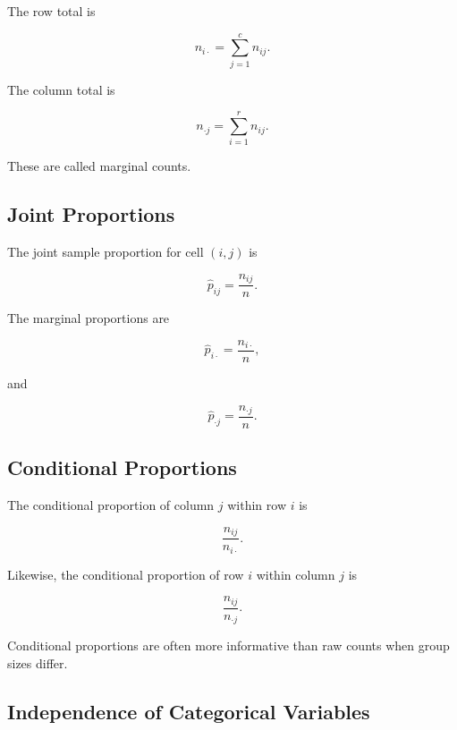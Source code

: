 The row total is

\[
\boxed{
n_{i\cdot}
=
\sum_{j=1}^{c}n_{ij}.
}
\]

The column total is

\[
\boxed{
n_{\cdot j}
=
\sum_{i=1}^{r}n_{ij}.
}
\]

These are called marginal counts.

\subsection{Joint Proportions}
\label{subsec:joint-proportions-categorical}

The joint sample proportion for cell \((i,j)\) is

\[
\boxed{
\widehat{p}_{ij}
=
\frac{n_{ij}}{n}.
}
\]

The marginal proportions are

\[
\boxed{
\widehat{p}_{i\cdot}
=
\frac{n_{i\cdot}}{n},
}
\]

and

\[
\boxed{
\widehat{p}_{\cdot j}
=
\frac{n_{\cdot j}}{n}.
}
\]

\subsection{Conditional Proportions}
\label{subsec:conditional-proportions-categorical}

The conditional proportion of column \(j\) within row \(i\) is

\[
\boxed{
\frac{n_{ij}}{n_{i\cdot}}.
}
\]

Likewise, the conditional proportion of row \(i\) within column \(j\) is

\[
\boxed{
\frac{n_{ij}}{n_{\cdot j}}.
}
\]

Conditional proportions are often more informative than raw counts when
group sizes differ.

\subsection{Independence of Categorical Variables}
\label{subsec:categorical-independence}

